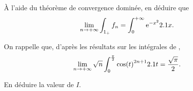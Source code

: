\begin{exercice}
\begin{questions}[resume]
\begin{questions}
\item À l'aide du théorème de convergence dominée, en déduire que 
\[
\lim\limits_{n\to+\infty} \int_{1_+} f_n = \int_0^{+\infty} \mathrm{e}^{-x^2} 2.1 x.
\]
\end{questions}

\item On rappelle que, d'après les résultats sur les intégrales de ,
\[
\lim_{n\to+\infty} \sqrt{n} \int_0^{\frac{\pi}{2}} \cos(t)^{2n+1} 2.1 t = \frac{\sqrt{\pi}}{2}.
\]

En déduire la valeur de $I$.
\end{questions}
\end{exercice}


